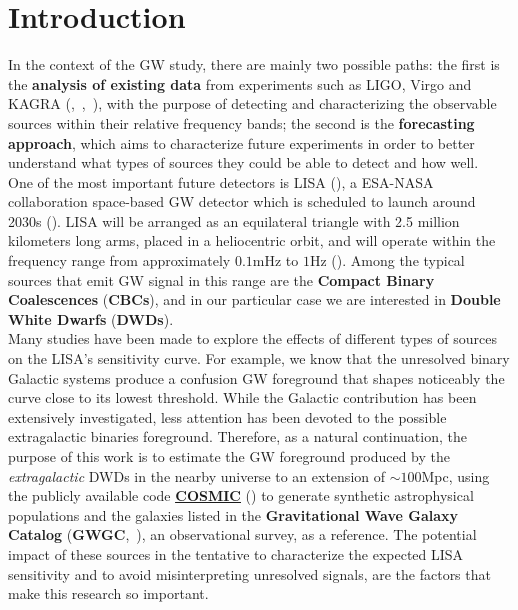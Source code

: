 \chapter*{Introduction}
In the context of the GW study, there are mainly two possible paths: the first is the \textbf{analysis of existing data} from experiments such as LIGO, Virgo and KAGRA ({\cite{LIGO_cit}},~\cite{Virgo_cit},~\cite{KAGRA}), with the purpose of detecting and characterizing the observable sources within their relative frequency bands;
the second is the \textbf{forecasting approach}, which aims to characterize future experiments in order to better understand what types of sources they could be able to detect and how well.
\vspace{2mm}\\
One of the most important future detectors is LISA (\cite{LISA_ref}), a ESA-NASA collaboration space-based GW detector which is scheduled to launch around 2030s (\cite{Luo_2016}). 
LISA will be arranged as an equilateral triangle with 2.5 million kilometers long arms, placed in a heliocentric orbit, and will operate within the frequency range from approximately $0.1\mathrm{mHz}$ to $1\mathrm{Hz}$ (\cite{baker2019laserinterferometerspaceantenna}).
Among the typical sources that emit GW signal in this range are the \textbf{Compact Binary Coalescences} (\textbf{CBCs}), and in our particular case we are interested in \textbf{Double White Dwarfs} (\textbf{DWDs}).
\vspace{2mm}\\
Many studies have been made to explore the effects of different types of sources on the LISA's sensitivity curve.
For example, we know that the unresolved binary Galactic systems produce a confusion GW foreground that shapes noticeably the curve close to its lowest threshold.
While the Galactic contribution has been extensively investigated, less attention has been devoted to the possible extragalactic binaries foreground.
Therefore, as a natural continuation, the purpose of this work is to estimate the GW foreground produced by the \textit{extragalactic} DWDs in the nearby universe to an extension of $\sim100$Mpc, using {the publicly available code} \underline{\textbf{\href{https://cosmic-popsynth.github.io/docs/stable/pages/about.html}{COSMIC}}} (\cite{Breivik}) to generate synthetic astrophysical populations and the galaxies listed in the \textbf{Gravitational Wave Galaxy Catalog} (\textbf{GWGC},~\cite{GWGC}), an observational survey, as a reference.
The potential impact of these sources in the tentative to characterize the expected LISA sensitivity and to avoid misinterpreting unresolved signals, are the factors that make this research so important.
